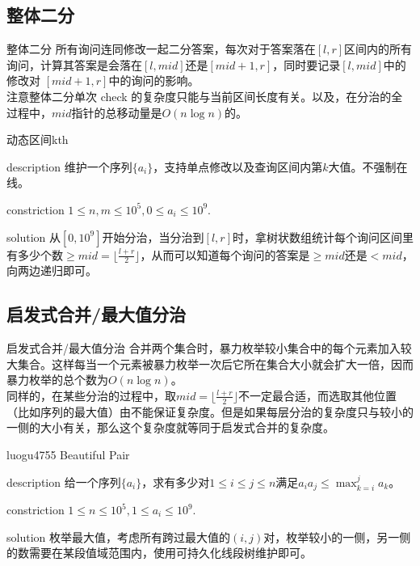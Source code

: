 \documentclass{beamer}
\begin{document}
	\subsection{整体二分}
	\begin{frame}{整体二分}
		所有询问连同修改一起二分答案，每次对于答案落在$[l, r]$区间内的所有询问，计算其答案是会落在$[l, mid]$还是$[mid + 1, r]$，同时要记录$[l, mid]$中的修改对 $[mid + 1, r]$中的询问的影响。\\
		
		注意整体二分单次 check 的复杂度只能与当前区间长度有关。以及，在分治的全过程中，$mid$指针的总移动量是$O(n\log n)$的。
	\end{frame}
	\begin{frame}{动态区间kth}
		\begin{block}{description}
			维护一个序列$\{a_i\}$，支持单点修改以及查询区间内第$k$大值。不强制在线。
		\end{block}
		\begin{block}{constriction}
			$1 \le n,m \le 10^5, 0 \le a_i \le 10^9.$
		\end{block}
		\pause
		\begin{block}{solution}
			从$[0,10^9]$开始分治，当分治到$[l,r]$时，拿树状数组统计每个询问区间里有多少个数$\ge mid=\lfloor\frac{l+r}{2}\rfloor$，从而可以知道每个询问的答案是$\ge mid$还是$< mid$，向两边递归即可。
		\end{block}
	\end{frame}
	\subsection{启发式合并/最大值分治}
	\begin{frame}{启发式合并/最大值分治}
		合并两个集合时，暴力枚举较小集合中的每个元素加入较大集合。这样每当一个元素被暴力枚举一次后它所在集合大小就会扩大一倍，因而暴力枚举的总个数为$O(n\log n)$。\\
		
		同样的，在某些分治的过程中，取$mid=\lfloor\frac{l+r}{2}\rfloor$不一定最合适，而选取其他位置（比如序列的最大值）由不能保证复杂度。但是如果每层分治的复杂度只与较小的一侧的大小有关，那么这个复杂度就等同于启发式合并的复杂度。
	\end{frame}
	\begin{frame}{luogu4755 Beautiful Pair}
		\begin{block}{description}
			给一个序列$\{a_i\}$，求有多少对$1 \le i \le j \le n$满足$a_ia_j \le \max_{k=i}^ja_k$。
		\end{block}
		\begin{block}{constriction}
			$1 \le n \le 10^5, 1 \le a_i \le 10^9.$
		\end{block}
		\pause
		\begin{block}{solution}
			枚举最大值，考虑所有跨过最大值的$(i,j)$对，枚举较小的一侧，另一侧的数需要在某段值域范围内，使用可持久化线段树维护即可。
		\end{block}
	\end{frame}
\end{document}
